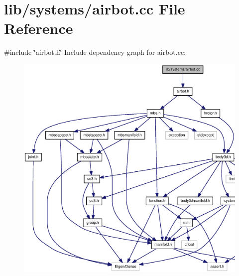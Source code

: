 \section{lib/systems/airbot.cc \-File \-Reference}
\label{airbot_8cc}
{\ttfamily \#include \char`\"{}airbot.\-h\char`\"{}}\*
\-Include dependency graph for airbot.\-cc\-:
\nopagebreak
\begin{figure}[H]
\begin{center}
\leavevmode
\includegraphics[width=350pt]{airbot_8cc__incl}
\end{center}
\end{figure}
